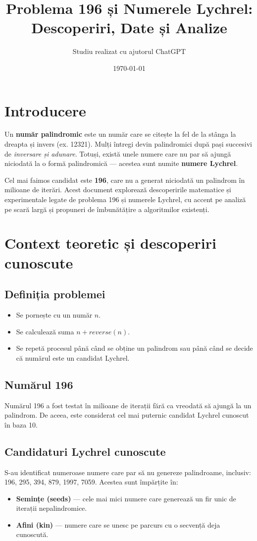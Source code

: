 \documentclass[12pt]{article}
\title{\textbf{Problema 196 și Numerele Lychrel: Descoperiri, Date și Analize}}
\author{Studiu realizat cu ajutorul ChatGPT}
\date{\today}
\begin{document}
\maketitle

\section{Introducere}
Un \textbf{număr palindromic} este un număr care se citește la fel de la stânga la dreapta și invers (ex. 12321). Mulți întregi devin palindromici după pași succesivi de \emph{inversare și adunare}. Totuși, există unele numere care nu par să ajungă niciodată la o formă palindromică — acestea sunt numite \textbf{numere Lychrel}.

Cel mai faimos candidat este \textbf{196}, care nu a generat niciodată un palindrom în milioane de iterări. Acest document explorează descoperirile matematice și experimentale legate de problema 196 și numerele Lychrel, cu accent pe analiză pe scară largă și propuneri de îmbunătățire a algoritmilor existenți.

\section{Context teoretic și descoperiri cunoscute}
\subsection{Definiția problemei}
\begin{itemize}
    \item Se pornește cu un număr $n$.
    \item Se calculează suma $n + reverse(n)$.
    \item Se repetă procesul până când se obține un palindrom sau până când se decide că numărul este un candidat Lychrel.
\end{itemize}

\subsection{Numărul 196}
Numărul 196 a fost testat în milioane de iterații fără ca vreodată să ajungă la un palindrom. De aceea, este considerat cel mai puternic candidat Lychrel cunoscut în baza 10.

\subsection{Candidaturi Lychrel cunoscute}
S-au identificat numeroase numere care par să nu genereze palindroame, inclusiv: 196, 295, 394, 879, 1997, 7059. Acestea sunt împărțite în:
\begin{itemize}
    \item \textbf{Semințe (seeds)} — cele mai mici numere care generează un fir unic de iterații nepalindromice.
    \item \textbf{Afini (kin)} — numere care se unesc pe parcurs cu o secvență deja cunoscută.
\end{itemize}
\end{document}
